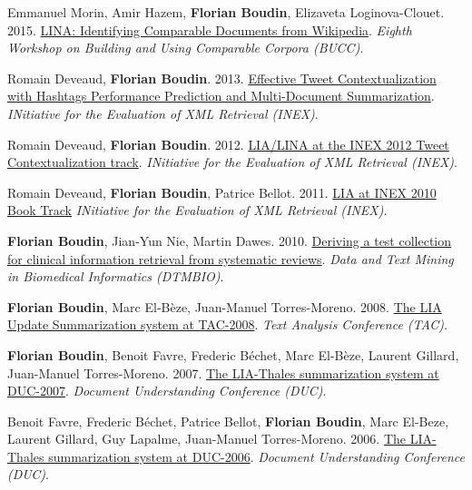 \item 
Emmanuel Morin, Amir Hazem, \textbf{Florian Boudin}, Elizaveta Loginova-Clouet.
2015.
\href{https://aclanthology.org/W15-3413.pdf}{LINA: Identifying Comparable Documents from Wikipedia}.
\textit{Eighth Workshop on Building and Using Comparable Corpora (BUCC)}.
\label{morin-etal-2015-lina}

\item 
Romain Deveaud, \textbf{Florian Boudin}.
2013.
\href{http://www.clef-initiative.eu/documents/71612/f20ff540-8fc7-476a-9c51-db20f8413cc6}{Effective Tweet Contextualization with Hashtags Performance Prediction and Multi-Document Summarization}.
\textit{INitiative for the Evaluation of XML Retrieval (INEX)}.
\label{deveaud-boudin-2013-effective}

\item 
Romain Deveaud, \textbf{Florian Boudin}.
2012.
\href{https://hal.science/hal-00755496/document}{LIA/LINA at the INEX 2012 Tweet Contextualization track}.
\textit{INitiative for the Evaluation of XML Retrieval (INEX)}.
\label{deveaud-boudin-2012-lia}

\item 
Romain Deveaud, \textbf{Florian Boudin}, Patrice Bellot.
2011.
\href{https://link.springer.com/chapter/10.1007/978-3-642-23577-1_10}{LIA at INEX 2010 Book Track}
\textit{INitiative for the Evaluation of XML Retrieval (INEX)}.
\label{deveaud-etal-2011-lia}

\item 
\textbf{Florian Boudin}, Jian-Yun Nie, Martin Dawes.
2010.
\href{https://dl.acm.org/doi/10.1145/1871871.1871882}{Deriving a test collection for clinical information retrieval from systematic reviews}.
\textit{Data and Text Mining in Biomedical Informatics (DTMBIO)}.
\label{boudin-etal-2010-deriving}

\item 
\textbf{Florian Boudin}, Marc El-Bèze, Juan-Manuel Torres-Moreno.
2008.
\href{https://www.nist.gov/tac/publications/2008/participant.papers/LIA.proceedings.pdf}{The LIA Update Summarization system at TAC-2008}.
\textit{Text Analysis Conference (TAC)}.
\label{boudin-etal-2008-lia}

\item 
\textbf{Florian Boudin}, Benoit Favre, Frederic Béchet, Marc El-Bèze, Laurent Gillard, Juan-Manuel Torres-Moreno.
2007.
\href{http://www-nlpir.nist.gov/projects/duc/pubs/2007papers/uavignon.ps}{The LIA-Thales summarization system at DUC-2007}.
\textit{Document Understanding Conference (DUC)}.
\label{boudin-etal-2007-lia}

\item 
Benoit Favre, Frederic Béchet, Patrice Bellot, \textbf{Florian Boudin}, Marc El-Beze, Laurent Gillard, Guy Lapalme, Juan-Manuel Torres-Moreno.
2006.
\href{http://www-nlpir.nist.gov/projects/duc/pubs/2006papers/LIA-Thales_Duc06_final.pdf}{The LIA-Thales summarization system at DUC-2006}.
\textit{Document Understanding Conference (DUC)}.
\label{favre-etal-2006-lia}